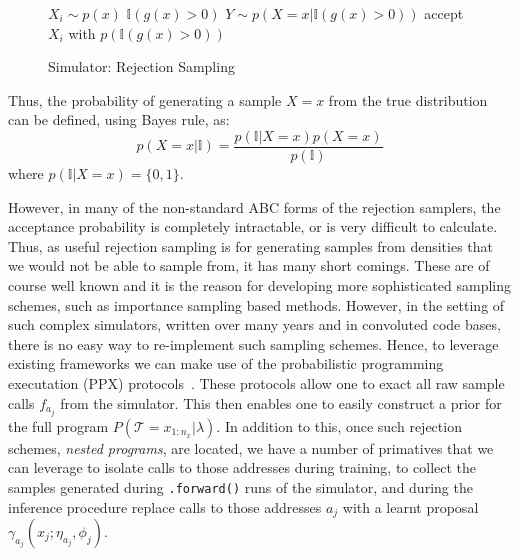 \documentclass{article}
\begin{document}
\begin{figure}
  \begin{minipage}{0.40\textwidth}
   \begin{algorithm}[H]
    \caption{Simulator: Rejection Sampling}
    \label{alg:rssim}
      \begin{algorithmic}
        \State $X_{i} \sim p(x)$ 
        \State $\mathbb{I}(g(x) > 0)$
        \State $ Y \sim p(X=x | \mathbb{I}(g(x) > 0))$
        \State accept $X_i$ with $p(\mathbb{I}(g(x) > 0))$
      \end{algorithmic}
    \end{algorithm}
  \end{minipage}
\end{figure}

Thus, the probability of generating a sample $X = x$ from the true distribution can be defined, using Bayes rule, 
as: 
\begin{equation}
  p(X=x| \mathbb{I}) = \frac{p(\mathbb{I} | X=x)p(X=x)}{p(\mathbb{I})} 
\end{equation}
where $p(\mathbb{I} | X=x) = \{0,1\}$.

However, in many of the non-standard ABC forms of the rejection samplers, the acceptance 
probability is completely intractable, or is very difficult to calculate. 
Thus, as useful rejection sampling is for generating samples from densities that we 
would not be able to sample from, it has many short comings. 
These are of course well known and it is the reason for developing more sophisticated 
sampling schemes, such as importance sampling based methods.
However, in the setting of such complex simulators, written over many years and
in convoluted code bases, there is no easy way to re-implement such sampling 
schemes.
Hence, to leverage existing frameworks we can make use of the probabilistic 
programming executation (PPX) protocols~\cite{baydin2018efficient}. 
These protocols allow one to exact all raw sample calls $f_{a_j}$ from the
simulator. This then enables one to easily construct a prior for the full program
$P(\mathcal{T} = x_{1:n_{x}}| \lambda)$. 
In addition to this, once such rejection schemes, \emph{nested programs}, are located, we have a number of 
primatives that we can leverage to isolate calls to those addresses during training, to collect the samples generated during 
\texttt{.forward()} runs of the simulator, 
and during the inference procedure replace calls to those addresses $a_j$ with a
learnt proposal $\gamma_{a_j}(x_j ; \eta_{a_j}, \phi_j ) $. 
\end{document}
